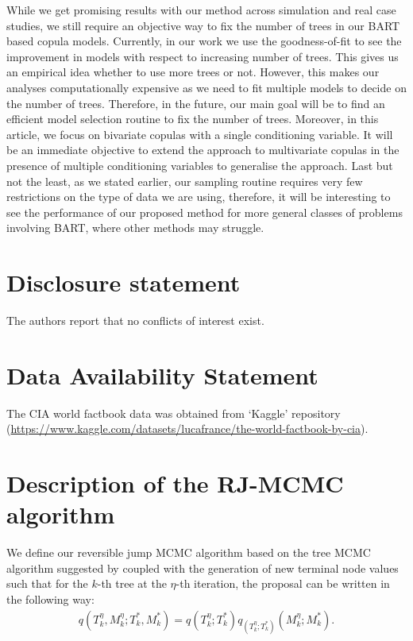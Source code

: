 \documentclass[
12pt]{article}
\begin{document}
	While we get promising results with our method across simulation and real case studies, we still require an objective way to fix the number of trees in our BART based copula models. Currently, in our work we use the goodness-of-fit to see the improvement in models with respect to increasing number of trees. This gives us an empirical idea whether to use more trees or not. However, this makes our analyses computationally expensive as we need to fit multiple models to decide on the number of trees. Therefore, in the future, our main goal will be to find an efficient model selection routine to fix the number of trees. Moreover, in this article, we focus on bivariate copulas with a single conditioning variable. It will be an immediate objective to extend the approach to multivariate copulas in the presence of multiple conditioning variables to generalise the approach. Last but not the least, as we stated earlier, our sampling routine requires very few restrictions on the type of data we are using, therefore, it will be interesting to see the performance of our proposed method for more general classes of problems involving BART, where other methods may struggle. 
	
	\section{Disclosure statement}\label{disclosure-statement}
	
	The authors report that no conflicts of interest exist.
	
	\section{Data Availability Statement}\label{data-availability-statement}
	
	The CIA world factbook data was obtained from `Kaggle' repository (\url{https://www.kaggle.com/datasets/lucafrance/the-world-factbook-by-cia}).
	
	
	
	\appendix
    
	\section{Description of the RJ-MCMC algorithm}\label{app:rj-mcmc}
	
	We define our reversible jump MCMC algorithm based on the tree MCMC algorithm suggested by \cite{chipman98BCART} coupled with the generation of new terminal node values such that for the $k$-th tree at the $\eta$-th iteration, the proposal can be written in the following way:
	\begin{align}\label{eq:prop}
		q\left(T_k^{\eta},M_k^{\eta};T_k^{\ast}, M_k^{\ast}\right) = q\left(T_k^{\eta};T_k^{\ast}\right) q_{\left(T_k^{\eta};T_k^{\ast}\right)}\left(M_k^{\eta};M_k^{\ast}\right).
	\end{align}
	
\end{document}
